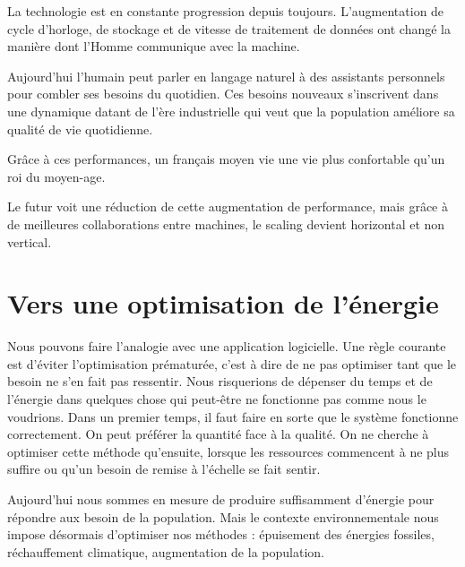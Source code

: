La technologie est en constante progression depuis toujours.
L'augmentation de cycle d'horloge, de stockage et de vitesse de traitement de données
ont changé la manière dont l'Homme communique avec la machine.

Aujourd'hui l'humain peut parler en langage naturel à des assistants personnels pour combler ses
besoins du quotidien.
Ces besoins nouveaux s'inscrivent dans une dynamique datant de l'ère industrielle qui veut que
la population améliore sa qualité de vie quotidienne.

Grâce à ces performances, un français moyen vie une vie plus confortable qu'un roi
du moyen-age.

Le futur voit une réduction de cette augmentation de performance, mais grâce à de meilleures collaborations
entre machines, le scaling devient horizontal et non vertical.



\section{Vers une optimisation de l'énergie}

Nous pouvons faire l’analogie avec une application logicielle. Une règle courante est d’éviter
l’optimisation prématurée, c’est à dire de ne pas optimiser tant que le besoin ne s’en fait pas
ressentir. Nous risquerions de dépenser du temps et de l'énergie dans quelques chose qui
peut-être ne fonctionne pas comme nous le voudrions.
Dans un premier temps, il faut faire en sorte que le système fonctionne correctement.
On peut préférer la quantité face à la qualité. On ne cherche à optimiser cette méthode
qu’ensuite, lorsque les ressources commencent à ne plus suffire ou qu’un besoin de remise
à l’échelle se fait sentir.

Aujourd'hui nous sommes en mesure de produire suffisamment d’énergie pour répondre aux
besoin de la population. Mais le contexte environnementale nous impose désormais d’optimiser
nos méthodes : épuisement des énergies fossiles, réchauffement climatique, augmentation de la
population.
